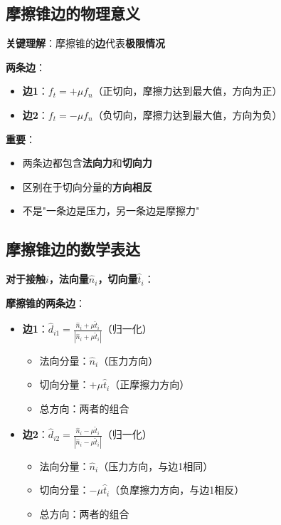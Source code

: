 \documentclass[12pt,a4paper]{article}
\begin{document}
\subsection{摩擦锥边的物理意义}

\textbf{关键理解}：摩擦锥的\textbf{边}代表\textbf{极限情况}

\textbf{两条边}：
\begin{itemize}
\item \textbf{边1}：$f_t = +\mu f_n$（正切向，摩擦力达到最大值，方向为正）
\item \textbf{边2}：$f_t = -\mu f_n$（负切向，摩擦力达到最大值，方向为负）
\end{itemize}

\textbf{重要}：
\begin{itemize}
\item 两条边都包含\textbf{法向力}和\textbf{切向力}
\item 区别在于切向分量的\textbf{方向相反}
\item 不是"一条边是压力，另一条边是摩擦力"
\end{itemize}

\subsection{摩擦锥边的数学表达}

\textbf{对于接触$i$，法向量$\hat{n}_i$，切向量$\hat{t}_i$}：

\textbf{摩擦锥的两条边}：
\begin{itemize}
\item \textbf{边1}：$\hat{d}_{i1} = \frac{\hat{n}_i + \mu \hat{t}_i}{|\hat{n}_i + \mu \hat{t}_i|}$（归一化）
   \begin{itemize}
   \item 法向分量：$\hat{n}_i$（压力方向）
   \item 切向分量：$+\mu \hat{t}_i$（正摩擦力方向）
   \item 总方向：两者的组合
   \end{itemize}

\item \textbf{边2}：$\hat{d}_{i2} = \frac{\hat{n}_i - \mu \hat{t}_i}{|\hat{n}_i - \mu \hat{t}_i|}$（归一化）
   \begin{itemize}
   \item 法向分量：$\hat{n}_i$（压力方向，与边1相同）
   \item 切向分量：$-\mu \hat{t}_i$（负摩擦力方向，与边1相反）
   \item 总方向：两者的组合
   \end{itemize}
\end{itemize}
\end{document}
